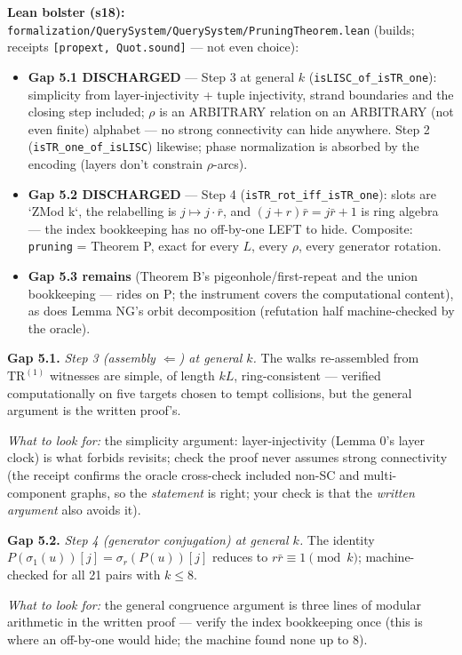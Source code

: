 \documentclass[11pt]{article}
\newcommand{\file}[1]{\texttt{\small #1}}
\newcommand{\gap}[1]{\medskip\noindent\textbf{Gap #1.}}
\newcommand{\lookfor}{\par\smallskip\noindent\emph{What to look for:} }
\begin{document}
\smallskip\noindent\textbf{Lean bolster (s18):}
\file{formalization/QuerySystem/QuerySystem/PruningTheorem.lean}
(builds; receipts \texttt{[propext, Quot.sound]} --- not even choice):
\begin{itemize}[leftmargin=2em]
\item \textbf{Gap 5.1 DISCHARGED} --- Step 3 at general $k$
  (\texttt{isLISC\_of\_isTR\_one}): simplicity from layer-injectivity +
  tuple injectivity, strand boundaries and the closing step included;
  $\rho$ is an ARBITRARY relation on an ARBITRARY (not even finite)
  alphabet --- no strong connectivity can hide anywhere. Step 2
  (\texttt{isTR\_one\_of\_isLISC}) likewise; phase normalization is
  absorbed by the encoding (layers don't constrain $\rho$-arcs).
\item \textbf{Gap 5.2 DISCHARGED} --- Step 4
  (\texttt{isTR\_rot\_iff\_isTR\_one}): slots are `ZMod k`, the
  relabelling is $j \mapsto j \cdot \bar r$, and $(j + r)\bar r = j\bar
  r + 1$ is ring algebra --- the index bookkeeping has no off-by-one
  LEFT to hide. Composite: \texttt{pruning} = Theorem P, exact for
  every $L$, every $\rho$, every generator rotation.
\item \textbf{Gap 5.3 remains} (Theorem B's pigeonhole/first-repeat and
  the union bookkeeping --- rides on P; the instrument covers the
  computational content), as does Lemma NG's orbit decomposition
  (refutation half machine-checked by the oracle).
\end{itemize}

\gap{5.1} \emph{Step 3 (assembly $\Leftarrow$) at general $k$.} The
walks re-assembled from $\mathrm{TR}^{(1)}$ witnesses are simple, of
length $kL$, ring-consistent --- verified computationally on five
targets chosen to tempt collisions, but the general argument is the
written proof's.
\lookfor the simplicity argument: layer-injectivity (Lemma 0's layer
clock) is what forbids revisits; check the proof never assumes strong
connectivity (the receipt confirms the oracle cross-check included
non-SC and multi-component graphs, so the \emph{statement} is right;
your check is that the \emph{written argument} also avoids it).

\gap{5.2} \emph{Step 4 (generator conjugation) at general $k$.} The
identity $P(\sigma_1(u))[j] = \sigma_r(P(u))[j]$ reduces to $r \bar r
\equiv 1 \pmod k$; machine-checked for all 21 pairs with $k \le 8$.
\lookfor the general congruence argument is three lines of modular
arithmetic in the written proof --- verify the index bookkeeping once
(this is where an off-by-one would hide; the machine found none up to
8).
\end{document}
